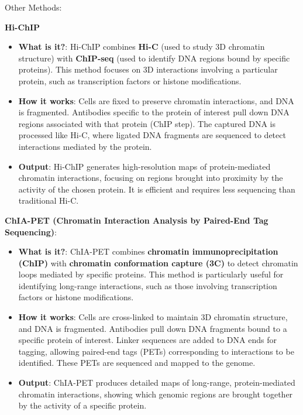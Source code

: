 \documentclass[a4paper]{article}
\begin{document}
Other Methods:

\textbf{Hi-ChIP}

\begin{itemize}

  \item \textbf{What is it?}: Hi-ChIP combines \textbf{Hi-C} (used to study 3D chromatin structure) 
  with \textbf{ChIP-seq} (used to identify DNA regions bound by specific 
  proteins). 
  This method focuses on 3D interactions involving a particular 
  protein, such as transcription factors or histone modifications. 

  \item \textbf{How it works}: 
  Cells are fixed to preserve chromatin interactions, and DNA is 
  fragmented. Antibodies specific to the protein of interest pull 
  down DNA regions associated with that protein (ChIP step). 
  The captured DNA is processed like Hi-C, where ligated DNA 
  fragments are sequenced to detect interactions mediated by the protein.

  \item \textbf{Output}: 
  Hi-ChIP generates high-resolution maps of protein-mediated 
  chromatin interactions, focusing on regions brought into 
  proximity by the activity of the chosen protein. 
  It is efficient and requires less sequencing than traditional Hi-C.
\end{itemize}

\textbf{ChIA-PET (Chromatin Interaction Analysis by Paired-End 
  Tag Sequencing)}: 

\begin{itemize}
  \item \textbf{What is it?}:  ChIA-PET combines \textbf{chromatin immunoprecipitation (ChIP)} 
  with \textbf{chromatin conformation capture (3C)} to detect chromatin 
  loops mediated by specific proteins.
  This method is particularly useful for identifying long-range interactions, 
  such as those involving transcription factors or histone modifications.

  \item \textbf{How it works}: 
  Cells are cross-linked to maintain 3D chromatin structure, and DNA is 
  fragmented. Antibodies pull down DNA fragments bound to a specific 
  protein of interest. 
  Linker sequences are added to DNA ends for tagging, allowing paired-end 
  tags (PETs) corresponding to interactions to be identified. These PETs 
  are sequenced and mapped to the genome.
  
  \item \textbf{Output}: 
  ChIA-PET produces detailed maps of long-range, protein-mediated chromatin 
  interactions, showing which genomic regions are brought together by the 
  activity of a specific protein.

\end{itemize}
\end{document}
